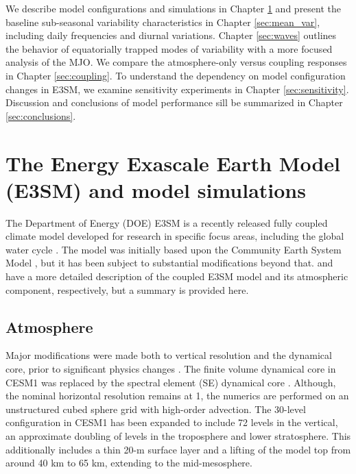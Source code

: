 \documentclass[draft,ms]{AGUTeX}
\begin{document}
\begin{article}
We describe model configurations and simulations in Chapter \ref{sec:model} and present the baseline sub-seasonal variability characteristics in Chapter \ref{sec:mean_var}, including daily frequencies and diurnal variations. Chapter \ref{sec:waves} outlines the behavior of equatorially trapped modes of variability with a more focused analysis of the MJO. We compare the atmosphere-only versus coupling responses in Chapter \ref{sec:coupling}. To understand the dependency on model configuration changes in E3SM, we examine sensitivity experiments in Chapter \ref{sec:sensitivity}. Discussion and conclusions of model performance sill be summarized in Chapter \ref{sec:conclusions}.



\section{The Energy Exascale Earth Model (E3SM) and model simulations}
\label{sec:model} The Department of Energy (DOE) E3SM is a recently released fully coupled climate model developed for research in specific focus areas, including the global water cycle \citep{Golaz2019}. The model was initially based upon the Community Earth System Model \citep[CESM1,][]{CESM1}, but it has been subject to substantial modifications beyond that. \cite{Golaz2019} and \cite{Xie2018} have a more detailed description of the coupled E3SM model and its atmospheric component, respectively, but a summary is provided here.
\subsection{Atmosphere}
Major modifications were made both to vertical resolution and the dynamical core, prior to significant physics changes \citep{Xie2018}. The finite volume dynamical core in CESM1 \citep{Lin2006,Lin1996} was replaced by the spectral element (SE) dynamical core \citep{Taylor2008}. Although, the nominal horizontal resolution remains at 1\deg, the numerics are performed on an unstructured cubed sphere grid with high-order advection. The 30-level configuration in CESM1 has been expanded to include 72 levels in the vertical, an approximate doubling of levels in the troposphere and lower stratosphere. This additionally includes a thin 20-m surface layer and a lifting of the model top from around 40 km to 65 km, extending to the mid-mesosphere.


\end{article}
\end{document}
